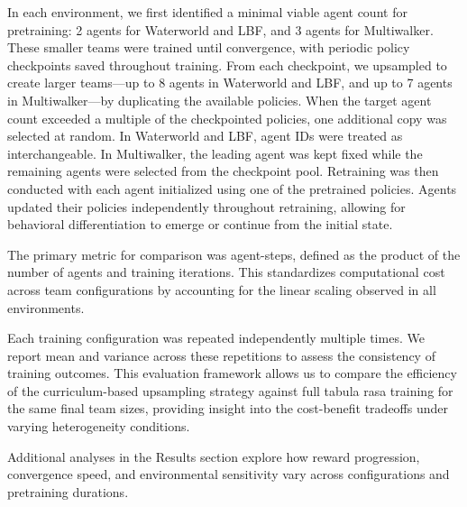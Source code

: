 \documentclass{article}
\begin{document}
In each environment, we first identified a minimal viable agent count for pretraining: 
2 agents for Waterworld and LBF, and 3 agents for Multiwalker. 
These smaller teams were trained until convergence, with periodic policy checkpoints saved 
throughout training. From each checkpoint, we upsampled to create larger teams—up to 8 agents in 
Waterworld and LBF, and up to 7 agents in Multiwalker—by duplicating the available policies. 
When the target agent count exceeded a multiple of the checkpointed policies, 
one additional copy was selected at random. In Waterworld and LBF, agent IDs were treated as 
interchangeable. In Multiwalker, the leading agent was kept fixed while the remaining agents 
were selected from the checkpoint pool. Retraining was then conducted with each agent 
initialized using one of the pretrained policies. Agents updated their policies independently 
throughout retraining, allowing for behavioral differentiation to emerge or continue from the 
initial state.

The primary metric for comparison was agent-steps, defined as the product of the number of 
agents and training iterations. This standardizes computational cost across team configurations 
by accounting for the linear scaling observed in all environments.

Each training configuration was repeated independently multiple times. We report mean and 
variance across these repetitions to assess the consistency of training outcomes. 
This evaluation framework allows us to compare the efficiency of the curriculum-based 
upsampling strategy against full tabula rasa training for the same final team sizes, 
providing insight into the cost-benefit tradeoffs under varying heterogeneity conditions.

Additional analyses in the Results section explore how reward progression, convergence speed, 
and environmental sensitivity vary across configurations and pretraining durations.
\end{document}
